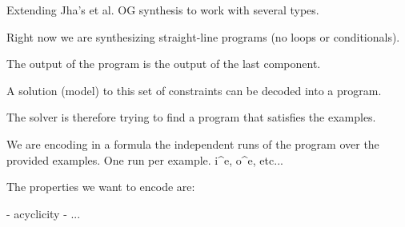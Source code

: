 Extending Jha's et al. OG synthesis to work with several types.

Right now we are synthesizing straight-line programs (no loops or conditionals).

The output of the program is the output of the last component.

A solution (model) to this set of constraints can be decoded into a program.

The solver is therefore trying to find a program that satisfies the examples.

We are encoding in a formula the independent runs of the program over the
provided examples. One run per example. i^e, o^e, etc...

The properties we want to encode are:

- acyclicity
- ...



